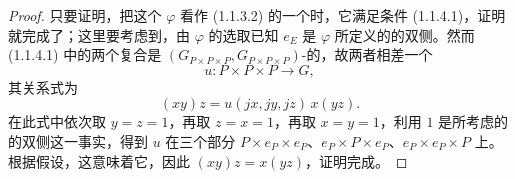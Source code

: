 \begin{proof}
只要证明，把这个 $\varphi$ 看作 (1.1.3.2) 的一个时，它满足条件 (1.1.4.1)，证明就完成了；这里要考虑到，由 $\varphi$ 的选取已知 $e_E$ 是 $\varphi$ 所定义的的双侧。然而 (1.1.4.1) 中的两个复合是 $(G_{P\times P\times P},G_{P\times P\times P})$-的，故两者相差一个
\[
u:P\times P\times P\longrightarrow G,
\]
其关系式为
\[
(xy)z=u(jx,jy,jz)\,x(yz).
\]
在此式中依次取 $y=z=1$，再取 $z=x=1$，再取 $x=y=1$，利用 $1$ 是所考虑的的双侧这一事实，得到 $u$ 在三个部分 $P\times e_P\times e_P$、$e_P\times P\times e_P$、$e_P\times e_P\times P$ 上。根据假设，这意味着它，因此 $(xy)z=x(yz)$，证明完成。
\end{proof}

